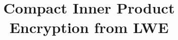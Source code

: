 \documentclass[11pt,hidelinks]{article}
\begin{document}
\title{Compact Inner Product Encryption from LWE}%

\author{}
\date{}
\maketitle

\begin{abstract}

\end{abstract}













\newpage




\end{document}
